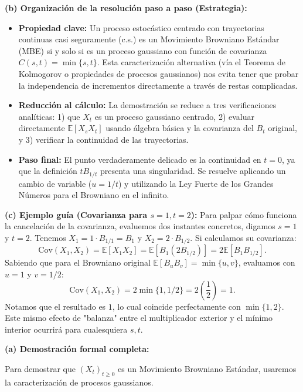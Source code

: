 \documentclass[11pt, letterpaper]{article}
\begin{document}
\begin{solucion}
    \textbf{(b) Organización de la resolución paso a paso (Estrategia):}
    \begin{itemize}
        \item[(i)] \textbf{Propiedad clave:} Un proceso estocástico centrado con trayectorias continuas casi seguramente (c.s.) es un Movimiento Browniano Estándar (MBE) si y solo si es un proceso gaussiano con función de covarianza $C(s,t) = \min\{s, t\}$. Esta caracterización alternativa (vía el Teorema de Kolmogorov o propiedades de procesos gaussianos) nos evita tener que probar la independencia de incrementos directamente a través de restas complicadas.
        \item[(ii)] \textbf{Reducción al cálculo:} La demostración se reduce a tres verificaciones analíticas: 1) que $X_t$ es un proceso gaussiano centrado, 2) evaluar directamente $\mathbb{E}[X_s X_t]$ usando álgebra básica y la covarianza del $B_t$ original, y 3) verificar la continuidad de las trayectorias.
        \item[(iii)] \textbf{Paso final:} El punto verdaderamente delicado es la continuidad en $t=0$, ya que la definición $t B_{1/t}$ presenta una singularidad. Se resuelve aplicando un cambio de variable ($u = 1/t$) y utilizando la Ley Fuerte de los Grandes Números para el Browniano en el infinito.
    \end{itemize}

    \vspace{3mm}
    \textbf{(c) Ejemplo guía (Covarianza para $s=1, t=2$):}
    Para palpar cómo funciona la cancelación de la covarianza, evaluemos dos instantes concretos, digamos $s=1$ y $t=2$.
    Tenemos $X_1 = 1 \cdot B_{1/1} = B_1$ y $X_2 = 2 \cdot B_{1/2}$.
    Si calculamos su covarianza:
    \[ \text{Cov}(X_1, X_2) = \mathbb{E}[X_1 X_2] = \mathbb{E}[B_1 (2 B_{1/2})] = 2 \mathbb{E}[B_1 B_{1/2}]. \]
    Sabiendo que para el Browniano original $\mathbb{E}[B_u B_v] = \min\{u, v\}$, evaluamos con $u=1$ y $v=1/2$:
    \[ \text{Cov}(X_1, X_2) = 2 \min\{1, 1/2\} = 2 \left( \frac{1}{2} \right) = 1. \]
    Notamos que el resultado es $1$, lo cual coincide perfectamente con $\min\{1, 2\}$. Este mismo efecto de "balanza" entre el multiplicador exterior y el mínimo interior ocurrirá para cualesquiera $s, t$.

    \vspace{3mm}
    \textbf{(a) Demostración formal completa:}

    Para demostrar que $(X_t)_{t\ge 0}$ es un Movimiento Browniano Estándar, usaremos la caracterización de procesos gaussianos.


\end{solucion}
\end{document}
